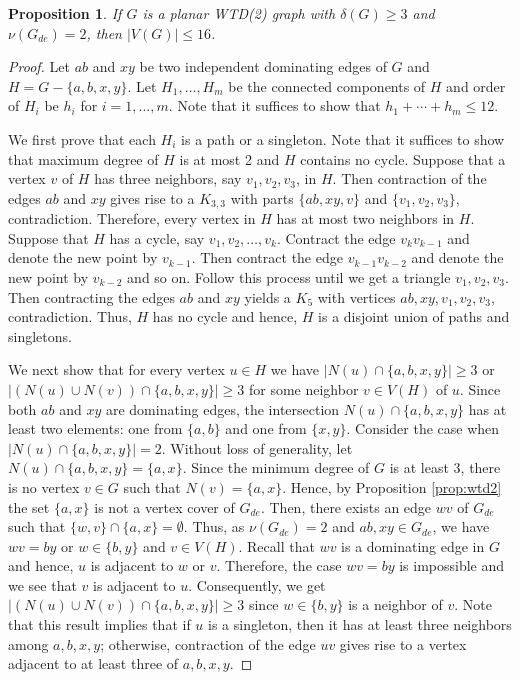 \documentclass[11pt]{article}
\newtheorem{proposition}[theorem]{Proposition}
\theoremstyle{definition}
\begin{document}
\begin{proposition}\label{prop:vGde=2}
If $G$ is a planar WTD(2) graph with $\delta(G) \geq 3$ and $\nu(G_{de})=2$,
then $|V(G)|\leq 16$.
\end{proposition}
\begin{proof}
Let $ab$ and $xy$ be two independent dominating edges of $G$ and $H=G-\{a,b,x,y\}$.
Let $H_1,\dots,H_m$ be the connected components of $H$ and order of $H_i$ be $h_i$ for $i=1,\dots,m$.
Note that it suffices to show that $h_1+\cdots +h_m \leq 12$.

We first prove that each $H_i$ is a path or a singleton.
Note that it suffices to show that maximum degree of $H$ is at most 2 and $H$ contains no cycle.
Suppose that a vertex $v$ of $H$ has three neighbors, say $v_1,v_2,v_3$, in $H$.
Then contraction of the edges $ab$ and $xy$ gives rise to a $K_{3,3}$ with parts $\{ab, xy,v\}$ and $\{v_1,v_2,v_3\}$, contradiction.
Therefore, every vertex in $H$ has at most two neighbors in $H$.
Suppose that $H$ has a cycle, say $v_1,v_2,\dots, v_k$.
Contract the edge $v_kv_{k-1}$ and denote the new point by $v_{k-1}$.
Then contract the edge $v_{k-1}v_{k-2}$ and denote the new point by $v_{k-2}$ and so on.
Follow this process until we get a triangle $v_1,v_2,v_3$.
Then contracting the edges $ab$ and $xy$ yields a $K_5$ with vertices $ab,xy,v_1,v_2,v_3$, contradiction.
Thus, $H$ has no cycle and hence, $H$ is a disjoint union of paths and singletons.


We next show that for every vertex $u\in H$ we have $|N(u)\cap \{a,b,x,y\}|\geq 3$ or $|(N(u)\cup N(v))\cap \{a,b,x,y\}|\geq 3$ for some neighbor $v\in V(H)$ of $u$.
Since both $ab$ and $xy$ are dominating edges, the intersection $N(u)\cap \{a,b,x,y\}$ has at least two elements: one from $\{a,b\}$ and one from $\{x,y\}$.
Consider the case when $|N(u)\cap \{a,b,x,y\}|= 2$.
Without loss of generality, let $N(u)\cap \{a,b,x,y\}=\{a,x\}$.
Since the minimum degree of $G$ is at least 3, there is no vertex $v \in G$ such that $N(v)=\{a, x\}$. Hence, by Proposition \ref{prop:wtd2} the set $\{a,x\}$ is not a vertex cover of $G_{de}$.
Then, there exists an edge $wv$ of $G_{de}$ such that $\{w,v\} \cap \{a,x\} =\emptyset$.
Thus, as $\nu(G_{de})=2$ and $ab,xy \in G_{de}$, we have $wv=by$ or $w\in \{b,y\}$ and $v\in V(H)$.
Recall that $wv$ is a dominating edge in $G$ and hence,
$u$ is adjacent to $w$ or $v$.
Therefore, the case $wv=by$ is impossible and we see that $v$ is adjacent to $u$.
Consequently, we get $|(N(u)\cup N(v))\cap \{a,b,x,y\}|\geq 3$ since $w\in \{b,y\}$ is a neighbor of $v$.
Note that this result implies that if $u$ is a singleton, then it has at least three neighbors among $a,b,x,y$; otherwise, contraction of the edge $uv$ gives rise to a vertex adjacent to at least three of $a,b,x,y$.


\end{proof}
\end{document}
